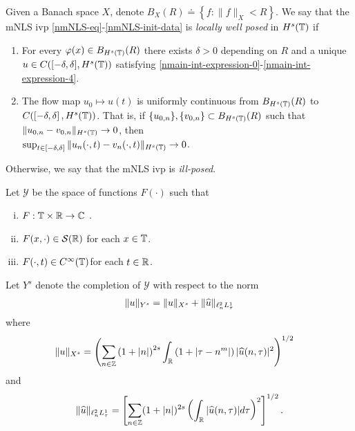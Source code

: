 \begin{definition}
  Given a Banach space $X$, denote $B_{X}(R) \doteq \left\{ f: \| f \|_{X} < R
      \right\}$. We say that the mNLS ivp \eqref{nmNLS-eq}-\eqref{nmNLS-init-data} is
	\emph{locally well posed} in
	$H^s(\mathbb{T})$ if 
	\begin{enumerate}
    \item For every $\varphi(x) \in B_{H^{s}(\mathbb{T})}(R)$
      there exists $\delta>0$ depending on $R$ and a unique $u \in C([-\delta,
      \delta], H^s(\mathbb{T}))$ satisfying
      \eqref{nmain-int-expression-0}-\eqref{nmain-int-expression-4}.
    \item
      The flow map $u_0 \mapsto u(t)$ is uniformly continuous from
      $B_{H^{s}(\mathbb{T})}(R)$ 
      to $C(\left[ -\delta, \delta \right], H^s(\mathbb{T}))$. That is, if
      $\{u_{0,n} \}, \{v_{0,n}\} \subset B_{H^{s}(\mathbb{T})}(R)$ such that $\|u_{0,n} -
      v_{0,n} \|_{H^{s}(\mathbb{T})} \to 0$, then \\
      $\sup_{t \in [-\delta, \delta]}
      \|u_{n}(\cdot, t) - v_{n}(\cdot, t) \|_{H^s(\mathbb{T})} \to 0$.
  \end{enumerate}
	Otherwise, we say that the mNLS ivp is \emph{ill-posed}.
\end{definition}
%
\begin{definition}
  Let $\mathcal{Y}$ be the space of functions $F(\cdot)$ such that
  \begin{enumerate}[(i)]
   \item{$F: \mathbb{T} \times \mathbb{R} \to \mathbb{C}$ }.
   \item{ $F(x, \cdot) \in \mathcal{S}(\mathbb{R})$ for each $x \in \mathbb{T}$}.
   \item{ $F(\cdot, t) \in C^{\infty}(\mathbb{T})$for each $t \in \mathbb{R}$}.
  \end{enumerate}
  Let $Y^{s}$ denote the completion of $\mathcal{Y}$ with
  respect to the norm
  \begin{equation}
	\label{nY-s-norm}
	\begin{split}
		\|u\|_{Y^s} = \|u\|_{X^s} + \|\widehat{u}\|_{ \ell^2_n L^1_\tau }
	\end{split}
\end{equation}
    where
\begin{equation}
	\label{nX^s-norm}
	\begin{split}
		& \|u\|_{X^s}
		= \left ( \sum_{n\in \mathbb{Z}} \left (1 + |n| \right )^{2s} \int_{\mathbb{R}} \left ( 1 + | 
		\tau - n^{m } | \right ) | \widehat{u} ( n, \tau ) |^2
		\right )^{1/2}
	\end{split}
\end{equation}
and
%
%
\begin{equation}
	\label{nE-norm}
	\|\widehat{u}\|_{ \ell^2_n L^1_\tau } = \left[ \sum_{n \in \mathbb{Z}}(1 + | n |)^{2s} \left(
	\int_{\mathbb{R}}| \widehat{u}(n, \tau) |d \tau \right)^{2} \right]^{1/2}.
\end{equation}
  \end{definition}

